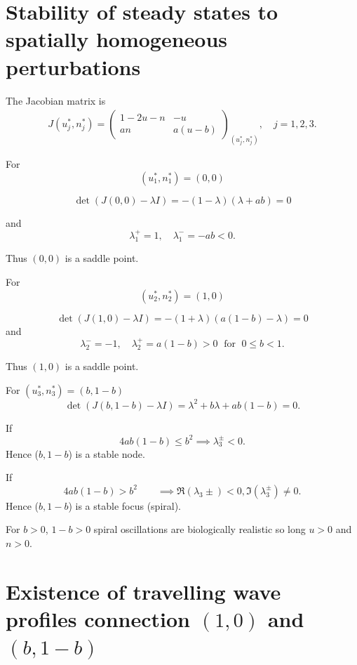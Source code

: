 \documentclass[
  letterpaper,
  DIV=11,
  numbers=noendperiod]{scrreprt}
\theoremstyle{plain}
\theoremstyle{definition}
\theoremstyle{plain}
\theoremstyle{remark}
\begin{document}
\hypertarget{stability-of-steady-states-to-spatially-homogeneous-perturbations}{%
\section{Stability of steady states to spatially homogeneous
perturbations}\label{stability-of-steady-states-to-spatially-homogeneous-perturbations}}

The Jacobian matrix is \[
\begin{aligned}
J(u_j^\ast, n^\ast_j) = 
\begin{pmatrix}
1-2u -n & -u \\
an &a(u-b)
\end{pmatrix}_{(u^\ast_j, n^\ast_j)}, \quad j = 1,2,3.
\end{aligned}
\]

For \[
(u_1^\ast, n_1^\ast)= (0,0)
\]

\[
\det(J (0,0) - \lambda I) = - (1- \lambda)(\lambda+ ab) = 0
\]

and \[
\lambda_1^+ = 1, \quad \lambda_1^- = - ab <0.
\]

Thus \((0,0)\) is a saddle point.

For \[
(u_2^\ast, n_2^\ast)= (1,0)
\]

\[
\det(J (1,0) - \lambda I) = - (1+ \lambda)(a(1-b)- \lambda) = 0
\] and \[
\lambda_2^- =- 1, \quad \lambda_2^+ = a(1-b) >0 \; \text{ for } \; 0 \leq b <1.
\]

Thus \((1,0)\) is a saddle point.

For \((u_3^\ast, n_3^\ast)= (b,1-b)\) \[
\det(J (b,1-b) - \lambda I) =\lambda^2 + b \lambda + ab(1-b) = 0.
\]

If \[
4 ab (1-b) \leq b^2  \implies \lambda_3^{\pm} < 0. 
\] Hence (\(b,1-b\)) is a stable node.

If\\
\[
4 ab (1-b) > b^2 \qquad \implies  \Re(\lambda_3{\pm}) < 0,  \Im(\lambda_3^{\pm}) \neq 0.
\] Hence (\(b,1-b\)) is a stable focus (spiral).

For \(b>0\), \(1-b>0\) spiral oscillations are biologically realistic so
long \(u>0\) and \(n>0\).

\hypertarget{existence-of-travelling-wave-profiles-connection-10-and-b1-b}{%
\section{\texorpdfstring{Existence of travelling wave profiles
connection \((1,0)\) and
\((b,1-b)\)}{Existence of travelling wave profiles connection (1,0) and (b,1-b)}}\label{existence-of-travelling-wave-profiles-connection-10-and-b1-b}}
\end{document}
